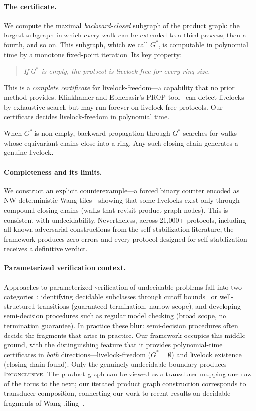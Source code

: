 \documentclass[11pt]{article}
\begin{document}
\paragraph{The certificate.} We compute the maximal \emph{backward-closed} subgraph of the product graph: the largest subgraph in which every walk can be extended to a third process, then a fourth, and so on. This subgraph, which we call $G^*$, is computable in polynomial time by a monotone fixed-point iteration. Its key property:
\begin{quote}
\emph{If $G^*$ is empty, the protocol is livelock-free for every ring size.}
\end{quote}
This is a \emph{complete certificate} for livelock-freedom---a capability that no prior method provides. Klinkhamer and Ebnenasir's PROP tool~\cite{klinkhamer-tr} can detect livelocks by exhaustive search but may run forever on livelock-free protocols. Our certificate decides livelock-freedom in polynomial time.

When $G^*$ is non-empty, backward propagation through $G^*$ searches for walks whose equivariant chains close into a ring. Any such closing chain generates a genuine livelock.

\paragraph{Completeness and its limits.} We construct an explicit counterexample---a forced binary counter encoded as NW-deterministic Wang tiles---showing that some livelocks exist only through compound closing chains (walks that revisit product graph nodes). This is consistent with undecidability. Nevertheless, across 21{,}000+ protocols, including all known adversarial constructions from the self-stabilization literature, the framework produces zero errors and every protocol designed for self-stabilization receives a definitive verdict.

\paragraph{Parameterized verification context.} Approaches to parameterized verification of undecidable problems fall into two categories~\cite{bloem-survey}: identifying decidable subclasses through cutoff bounds~\cite{emerson-namjoshi} or well-structured transitions (guaranteed termination, narrow scope), and developing semi-decision procedures such as regular model checking (broad scope, no termination guarantee). In practice these blur: semi-decision procedures often decide the fragments that arise in practice. Our framework occupies this middle ground, with the distinguishing feature that it provides polynomial-time certificates in \emph{both} directions---livelock-freedom ($G^* = \emptyset$) and livelock existence (closing chain found). Only the genuinely undecidable boundary produces \textsc{Inconclusive}. The product graph can be viewed as a transducer mapping one row of the torus to the next; our iterated product graph construction corresponds to transducer composition, connecting our work to recent results on decidable fragments of Wang tiling~\cite{aubrun-robust}.
\end{document}
